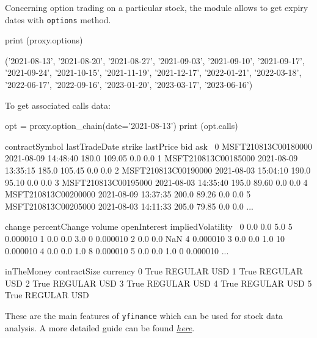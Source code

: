 Concerning option trading on a particular stock, the module allows to get expiry dates with \texttt{options} method.

\begin{ipython}
print (proxy.options)
\end{ipython}
\begin{ioutput}
('2021-08-13', '2021-08-20', '2021-08-27', '2021-09-03', '2021-09-10', 
 '2021-09-17', '2021-09-24', '2021-10-15', '2021-11-19', '2021-12-17', 
 '2022-01-21', '2022-03-18', '2022-06-17', '2022-09-16', '2023-01-20', 
 '2023-03-17', '2023-06-16')
\end{ioutput}

To get associated calls data:
\begin{ipython}
opt = proxy.option_chain(date='2021-08-13')
print (opt.calls)
\end{ipython}
\begin{ioutput}
         contractSymbol       lastTradeDate  strike  lastPrice  bid  ask  \
0   MSFT210813C00180000 2021-08-09 14:48:40   180.0     109.05  0.0  0.0   
1   MSFT210813C00185000 2021-08-09 13:35:15   185.0     105.45  0.0  0.0   
2   MSFT210813C00190000 2021-08-03 15:04:10   190.0      95.10  0.0  0.0   
3   MSFT210813C00195000 2021-08-03 14:35:40   195.0      89.60  0.0  0.0   
4   MSFT210813C00200000 2021-08-09 13:37:35   200.0      89.26  0.0  0.0   
5   MSFT210813C00205000 2021-08-03 14:11:33   205.0      79.85  0.0  0.0   
...

    change  percentChange   volume  openInterest  impliedVolatility  \
0      0.0            0.0      5.0             5           0.000010   
1      0.0            0.0      3.0             0           0.000010   
2      0.0            0.0      NaN             4           0.000010   
3      0.0            0.0      1.0            10           0.000010   
4      0.0            0.0      1.0             8           0.000010   
5      0.0            0.0      1.0             0           0.000010   
...

    inTheMoney contractSize currency  
0         True      REGULAR      USD  
1         True      REGULAR      USD  
2         True      REGULAR      USD  
3         True      REGULAR      USD  
4         True      REGULAR      USD  
5         True      REGULAR      USD  
\end{ioutput}

These are the main features of \texttt{yfinance} which can be used for stock data analysis. A more detailed guide can be found \href{https://algotrading101.com/learn/yfinance-guide/}{\emph{here}}.

